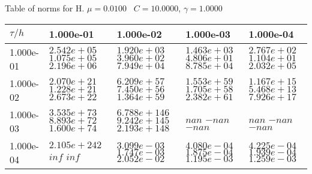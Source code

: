 \begin{center}
Table of norms for H. $\mu = 0.0100$ \, $C = 10.0000$, $\gamma = 1.0000$
  
\begin{tabular}{|p{1in}|p{1in}|p{1in}|p{1in}|p{1in}|} \hline
$\tau / h$ &1.000e-01 &1.000e-02 &1.000e-03 &1.000e-04 \\ \hline 
1.000e-01 & $2.542e+05$  $1.075e+05$  $2.196e+06$  & $1.920e+03$  $3.960e+02$  $7.949e+04$  & $1.463e+03$  $4.806e+01$  $8.785e+04$  & $2.767e+02$  $1.104e+01$  $2.032e+05$  \\ \hline 
1.000e-02 & $2.070e+21$  $1.228e+21$  $2.673e+22$  & $6.209e+57$  $7.450e+56$  $1.364e+59$  & $1.553e+59$  $1.705e+58$  $2.382e+61$  & $1.167e+15$  $5.468e+13$  $7.926e+17$  \\ \hline 
1.000e-03 & $3.535e+73$  $8.893e+72$  $1.600e+74$  & $6.788e+146$  $9.242e+145$  $2.193e+148$  & $nan$  $-nan$  $-nan$  & $nan$  $-nan$  $-nan$  \\ \hline 
1.000e-04 & $2.105e+242$  $inf$  $inf$  & $3.099e-03$  $1.747e-03$  $2.052e-02$  & $4.080e-04$  $1.875e-04$  $1.195e-03$  & $4.225e-04$  $1.939e-04$  $1.259e-03$  \\ \hline 

\end{tabular}\\[20pt]
\end{center}
